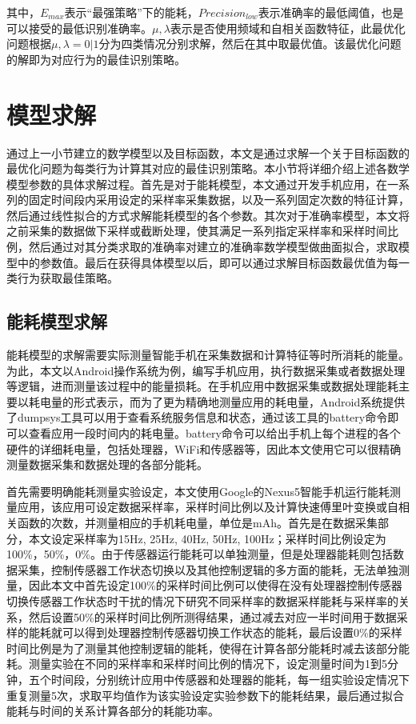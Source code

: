 其中，$E_{max}$表示“最强策略”下的能耗，$Precision_{low}$表示准确率的最低阈值，也是可以接受的最低识别准确率。$\mu, \lambda$表示是否使用频域和自相关函数特征，此最优化问题根据$\mu, \lambda = 0|1$分为四类情况分别求解，然后在其中取最优值。该最优化问题的解即为对应行为的最佳识别策略。


\section{模型求解}
\par 通过上一小节建立的数学模型以及目标函数，本文是通过求解一个关于目标函数的最优化问题为每类行为计算其对应的最佳识别策略。本小节将详细介绍上述各数学模型参数的具体求解过程。首先是对于能耗模型，本文通过开发手机应用，在一系列的固定时间段内采用设定的采样率采集数据，以及一系列固定次数的特征计算，然后通过线性拟合的方式求解能耗模型的各个参数。其次对于准确率模型，本文将之前采集的数据做下采样或截断处理，使其满足一系列指定采样率和采样时间比例，然后通过对其分类求取的准确率对建立的准确率数学模型做曲面拟合，求取模型中的参数值。最后在获得具体模型以后，即可以通过求解目标函数最优值为每一类行为获取最佳策略。

\subsection{能耗模型求解}
\par 能耗模型的求解需要实际测量智能手机在采集数据和计算特征等时所消耗的能量。为此，本文以Android操作系统为例，编写手机应用，执行数据采集或者数据处理等逻辑，进而测量该过程中的能量损耗。在手机应用中数据采集或数据处理能耗主要以耗电量的形式表示，而为了更为精确地测量应用的耗电量，Android系统提供了dumpsys工具可以用于查看系统服务信息和状态，通过该工具的battery命令即可以查看应用一段时间内的耗电量。battery命令可以给出手机上每个进程的各个硬件的详细耗电量，包括处理器，WiFi和传感器等，因此本文使用它可以很精确测量数据采集和数据处理的各部分能耗。
\par 首先需要明确能耗测量实验设定，本文使用Google的Nexus5智能手机运行能耗测量应用，该应用可设定数据采样率，采样时间比例以及计算快速傅里叶变换或自相关函数的次数，并测量相应的手机耗电量，单位是mAh。首先是在数据采集部分，本文设定采样率为15Hz, 25Hz, 40Hz, 50Hz, 100Hz；采样时间比例设定为100\%，50\%，0\%。由于传感器运行能耗可以单独测量，但是处理器能耗则包括数据采集，控制传感器工作状态切换以及其他控制逻辑的多方面的能耗，无法单独测量，因此本文中首先设定100\%的采样时间比例可以使得在没有处理器控制传感器切换传感器工作状态时干扰的情况下研究不同采样率的数据采样能耗与采样率的关系，然后设置50\%的采样时间比例所测得结果，通过减去对应一半时间用于数据采样的能耗就可以得到处理器控制传感器切换工作状态的能耗，最后设置0\%的采样时间比例是为了测量其他控制逻辑的能耗，使得在计算各部分能耗时减去该部分能耗。测量实验在不同的采样率和采样时间比例的情况下，设定测量时间为1到5分钟，五个时间段，分别统计应用中传感器和处理器的能耗，每一组实验设定情况下重复测量5次，求取平均值作为该实验设定实验参数下的能耗结果，最后通过拟合能耗与时间的关系计算各部分的耗能功率。

